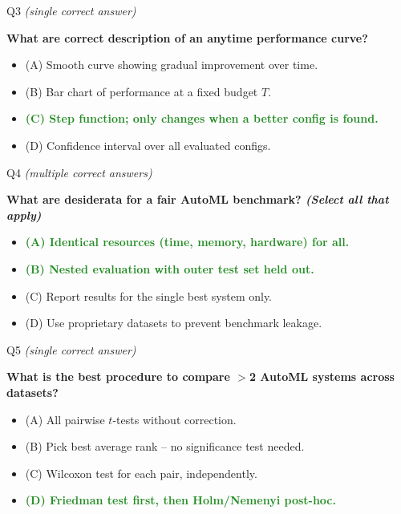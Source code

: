 \documentclass[main]{subfiles}
\newcommand{\correct}[1]{\textcolor{ForestGreen}{\textbf{#1} \checkmark}}
\newcommand{\wrong}[1]{#1}
\begin{document}
\begin{frame}{Q3 \hfill \small\normalfont\textit{(single correct answer)}}

\textbf{What are correct description of an anytime performance curve?}

\begin{itemize}
    \item \wrong{(A) \; Smooth curve showing gradual improvement over time.}
    \item \wrong{(B) \; Bar chart of performance at a fixed budget $T$.}
    \item \correct{(C) \; Step function; only changes when a better config is found.}
    \item \wrong{(D) \; Confidence interval over all evaluated configs.}
\end{itemize}

\end{frame}

\begin{frame}{Q4 \hfill \small\normalfont\textit{(multiple correct answers)}}

\textbf{What are desiderata for a fair AutoML benchmark? \textit{(Select all that apply)}}

\begin{itemize}
    \item \correct{(A) \; Identical resources (time, memory, hardware) for all.}
    \item \correct{(B) \; Nested evaluation with outer test set held out.}
    \item \wrong{(C) \; Report results for the single best system only.}
    \item \wrong{(D) \; Use proprietary datasets to prevent benchmark leakage.}
\end{itemize}

\end{frame}

\begin{frame}{Q5 \hfill \small\normalfont\textit{(single correct answer)}}

\textbf{What is the best procedure to compare $>$2 AutoML systems across datasets?}

\begin{itemize}
    \item \wrong{(A) \; All pairwise $t$-tests without correction.}
    \item \wrong{(B) \; Pick best average rank -- no significance test needed.}
    \item \wrong{(C) \; Wilcoxon test for each pair, independently.}
    \item \correct{(D) \; Friedman test first, then Holm/Nemenyi post-hoc.}
\end{itemize}

\end{frame}
\end{document}

